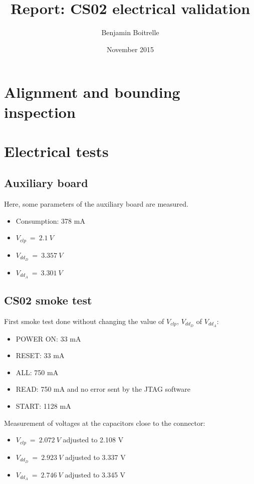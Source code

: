 \documentclass[a4papper, 10pt]{article}
\title{Report: CS02 electrical validation}
\author{Benjamin Boitrelle}
\date{November 2015}
\begin{document}
    \maketitle
    \tableofcontents

  \section{Alignment and bounding inspection}
  \section{Electrical tests}
    \subsection{Auxiliary board}
    
   Here, some parameters of the auxiliary board are measured.
   \begin{itemize}
     \item Consumption: 378 mA
     \item $V_{clp} \ = \ 2.1 \ V$
     \item $V_{dd_D} \ = \ 3.357 \ V$
     \item $V_{dd_A} \ = \ 3.301 \ V$
   \end{itemize}

     \subsection{CS02 smoke test}

    First smoke test done without changing the value of  $V_{clp}$, $V_{dd_D}$ of $V_{dd_A}$:
     \begin{itemize}
       \item POWER ON: 33 mA
       \item RESET: 33 mA
       \item ALL: 750 mA
       \item READ: 750 mA and no error sent by the JTAG software
       \item START: 1128 mA
     \end{itemize}

     Measurement of voltages at the capacitors close to the connector:
     
     \begin{itemize}
       \item $V_{clp} \ = \ 2.072 \ V$ adjusted to 2.108 V
       \item $V_{dd_D} \ = \ 2.923 \ V$ adjusted to 3.337 V
       \item $V_{dd_A} \ = \ 2.746 \ V$ adjusted to 3.345 V
     \end{itemize}
\end{document}
